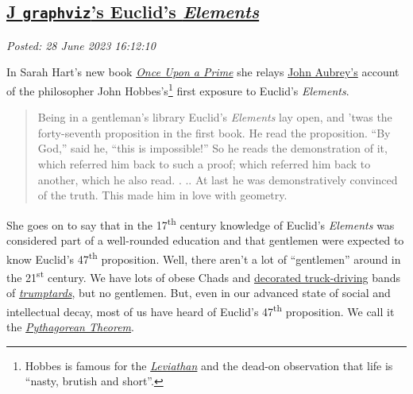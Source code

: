 %

\subsection*{\href{https://analyzethedatanotthedrivel.org/2023/06/28/j-graphvizs-euclids-elements/}{J \texttt{graphviz}’s Euclid’s \emph{Elements}}}


\noindent\emph{Posted: 28 June 2023 16:12:10}
\vspace{6pt}

In Sarah Hart's new book
\href{https://www.theguardian.com/books/2023/apr/25/once-upon-a-prime-sarah-hart-review-why-maths-and-literature-make-a-winning-formula}{\emph{Once
Upon a Prime}} she relays
\href{https://en.wikipedia.org/wiki/John_Aubrey}{John Aubrey's} account
of the philosopher John Hobbes's\footnote{Hobbes is famous for the
  \href{https://www.britannica.com/topic/Leviathan-by-Hobbes}{\emph{Leviathan}}
  and the dead-on observation that life is ``nasty, brutish and short''.}
first exposure to Euclid's \emph{Elements}.

\begin{quote}
Being in a gentleman's library Euclid's \emph{Elements} lay open, and
'twas the forty-seventh proposition in the first book. He read the
proposition. ``By God,'' said he, ``this is impossible!'' So he reads
the demonstration of it, which referred him back to such a proof; which
referred him back to another, which he also read. . .. At last he was
demonstratively convinced of the truth. This made him in love with
geometry.
\end{quote}

She goes on to say that in the 17\textsuperscript{th} century knowledge
of Euclid's \emph{Elements} was considered part of a well-rounded
education and that gentlemen were expected to know Euclid's
47\textsuperscript{th} proposition. Well, there aren't a lot of
``gentlemen'' around in the 21\textsuperscript{st} century. We have lots
of obese Chads and
\href{https://www.youtube.com/watch?v=yOCJkSlnjG0}{decorated
truck-driving} bands of
\href{https://www.urbandictionary.com/define.php?term=Trumptard\%27s}{\emph{trumptards}},
but no gentlemen. But, even in our advanced state of social and
intellectual decay, most of us have heard of Euclid's
47\textsuperscript{th} proposition. We call it the
\href{https://analyzethedatanotthedrivel.org/2022/09/28/on-eponymous-erasure/}{\emph{Pythagorean
Theorem}}.


